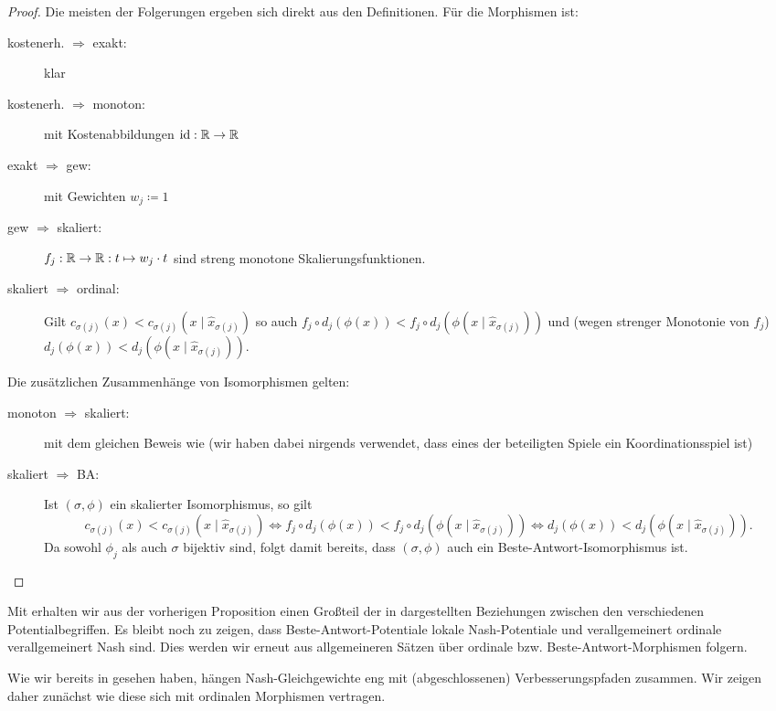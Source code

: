 \begin{proof}
	Die meisten der Folgerungen ergeben sich direkt aus den Definitionen. Für die Morphismen ist:
	\begin{description}
		\item[kostenerh. $\bm{\Rightarrow}$ exakt:] klar
		\item[kostenerh. $\bm{\Rightarrow}$ monoton:] mit Kostenabbildungen $\mathrm{id}: \mathbb{R} \to \mathbb{R}$
		\item[exakt $\bm{\Rightarrow}$ gew:] mit Gewichten $w_j \coloneqq 1$
		\item[gew $\bm{\Rightarrow}$ skaliert:] $f_j: \mathbb{R} \to \mathbb{R}: t \mapsto w_j \cdot t$ sind streng monotone Skalierungsfunktionen.
		\item[skaliert $\bm{\Rightarrow}$ ordinal:] Gilt $c_{\sigma(j)}(x) < c_{\sigma(j)}(x \mid \hat{x}_{\sigma(j)})$ so auch $f_j \circ d_j(\phi(x)) < f_j \circ d_j(\phi(x \mid \hat{x}_{\sigma(j)}))$ und (wegen strenger Monotonie von $f_j$) $d_j(\phi(x)) < d_j(\phi(x \mid \hat{x}_{\sigma(j)}))$.
	\end{description}
	Die zusätzlichen Zusammenhänge von Isomorphismen gelten:
	\begin{description}
		\item[monoton $\bm{\Rightarrow}$ skaliert:] mit dem gleichen Beweis wie  (wir haben dabei nirgends verwendet, dass eines der beteiligten Spiele ein Koordinationsspiel ist)
		\item[skaliert $\bm{\Rightarrow}$ BA:] Ist $(\sigma, \phi)$ ein skalierter Isomorphismus, so gilt 
			\[c_{\sigma(j)}(x) < c_{\sigma(j)}(x \mid \hat{x}_{\sigma(j)}) \iff f_j \circ d_j(\phi(x)) < f_j \circ d_j(\phi(x \mid \hat{x}_{\sigma(j)})) \iff d_j(\phi(x)) < d_j(\phi(x \mid \hat{x}_{\sigma(j)})).\]
		Da sowohl $\phi_j$ als auch $\sigma$ bijektiv sind, folgt damit bereits, dass $(\sigma, \phi)$ auch ein Beste-Antwort-Isomorphismus ist. \qedhere
	\end{description}	
\end{proof}

Mit  erhalten wir aus der vorherigen Proposition einen Großteil der in  dargestellten Beziehungen zwischen den verschiedenen Potentialbegriffen. Es bleibt noch zu zeigen, dass Beste-Antwort-Potentiale lokale Nash-Potentiale und verallgemeinert ordinale verallgemeinert Nash sind. Dies werden wir erneut aus allgemeineren Sätzen über ordinale bzw. Beste-Antwort-Morphismen folgern.

Wie wir bereits in  gesehen haben, hängen Nash-Gleichgewichte eng mit (abgeschlossenen) Verbesserungspfaden zusammen. Wir zeigen daher zunächst wie diese sich mit ordinalen Morphismen vertragen.

